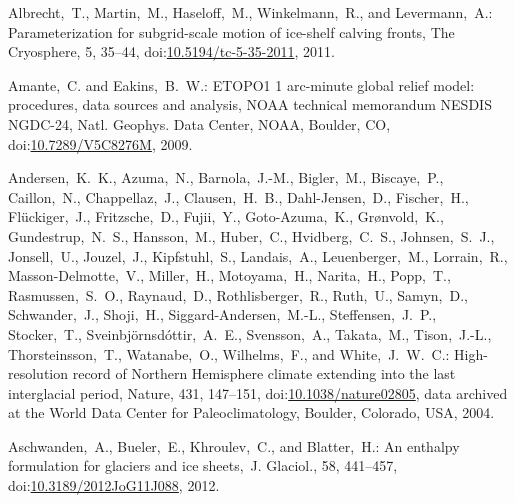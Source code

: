 \documentclass[tc, manuscript]{copernicus}
\begin{document}
\begin{thebibliography}{114}

 Albrecht,~T., Martin,~M., Haseloff,~M., Winkelmann,~R., and Levermann,~A.: Parameterization for subgrid-scale motion of ice-shelf calving fronts, The Cryosphere, 5, 35--44,
doi:\href{http://dx.doi.org/10.5194/tc-5-35-2011}{10.5194/tc-5-35-2011}, 2011.


Amante,~C. and Eakins,~B.~W.: ETOPO1 1 arc-minute global relief model: procedures, data sources and analysis, NOAA technical memorandum NESDIS NGDC-24, Natl. Geophys. Data Center, NOAA, Boulder, CO,
doi:\href{http://dx.doi.org/10.7289/V5C8276M}{10.7289/V5C8276M}, 2009.


Andersen,~K.~K., Azuma,~N., Barnola,~J.-M., Bigler,~M., Biscaye,~P., Caillon,~N., Chappellaz,~J., Clausen,~H.~B., Dahl-Jensen,~D., Fischer,~H., Fl\"uckiger,~J., Fritzsche,~D., Fujii,~Y., Goto-Azuma,~K., Gr{\o}nvold,~K., Gundestrup,~N.~S., Hansson,~M., Huber,~C., Hvidberg,~C.~S., Johnsen,~S.~J., Jonsell,~U., Jouzel,~J., Kipfstuhl,~S., Landais,~A., Leuenberger,~M., Lorrain,~R., Masson-Delmotte,~V., Miller,~H., Motoyama,~H., Narita,~H., Popp,~T., Rasmussen,~S.~O., Raynaud,~D., Rothlisberger,~R., Ruth,~U., Samyn,~D., Schwander,~J., Shoji,~H., Siggard-Andersen,~M.-L., Steffensen,~J.~P., Stocker,~T., Sveinbj\"ornsd\'ottir,~A.~E., Svensson,~A., Takata,~M., Tison,~J.-L., Thorsteinsson,~T., Watanabe,~O., Wilhelms,~F., and White,~J.~W.~C.: High-resolution record of Northern Hemisphere climate extending into the last interglacial period, Nature, 431, 147--151,
doi:\href{http://dx.doi.org/10.1038/nature02805}{10.1038/nature02805}, data archived at the World Data Center for Paleoclimatology, Boulder, Colorado, USA, 2004.


Aschwanden,~A., Bueler,~E., Khroulev,~C., and Blatter,~H.: An enthalpy formulation for glaciers and ice sheets,~J. Glaciol., 58, 441--457,
doi:\href{http://dx.doi.org/10.3189/2012JoG11J088}{10.3189/2012JoG11J088}, 2012.



\end{thebibliography}
\end{document}
